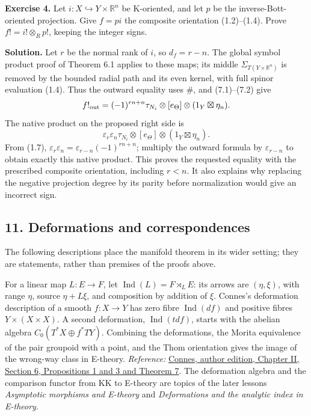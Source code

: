 \documentclass[
  11pt,
]{article}
\begin{document}
\textbf{Exercise 4.} Let \(i:X\hookrightarrow Y\times\mathbb R^n\) be
K-oriented, and let \(p\) be the inverse-Bott-oriented projection. Give
\(f=p i\) the composite orientation (1.2)--(1.4). Prove
\(f!=i!\otimes_Rp!\), keeping the integer signs.

\textbf{Solution.} Let \(r\) be the normal rank of \(i\), so
\(d_f=r-n\). The global symbol product proof of Theorem 6.1 applies to
these maps; its middle \(\Sigma_{T(Y\times\mathbb R^n)}\) is removed by
the bounded radial path and its even kernel, with full spinor evaluation
(1.4). Thus the outward equality uses \(\#\), and (7.1)--(7.2) give \[
 f!_{\rm out}=(-1)^{rn+n}\tau_{N_i}\otimes[e_\Theta]
                         \otimes(1_Y\boxtimes\eta_n).
\] The native product on the proposed right side is \[
 \varepsilon_r\varepsilon_n\tau_{N_i}\otimes[e_\Theta]
                         \otimes(1_Y\boxtimes\eta_n).
\] From (1.7),
\(\varepsilon_r\varepsilon_n=\varepsilon_{r-n}(-1)^{rn+n}\); multiply
the outward formula by \(\varepsilon_{r-n}\) to obtain exactly this
native product. This proves the requested equality with the prescribed
composite orientation, including \(r<n\). It also explains why replacing
the negative projection degree by its parity before normalization would
give an incorrect sign.

\subsection{11. Deformations and
correspondences}\label{deformations-and-correspondences}

The following descriptions place the manifold theorem in its wider
setting; they are statements, rather than premises of the proofs above.

For a linear map \(L:E\to F\), let
\(\operatorname{Ind}(L)=F\rtimes_LE\): its arrows are \((\eta,\xi)\),
with range \(\eta\), source \(\eta+L\xi\), and composition by addition
of \(\xi\). Connes's deformation description of a smooth \(f:X\to Y\)
has zero fibre \(\operatorname{Ind}(df)\) and positive fibres
\(Y\times(X\times X)\). A second deformation,
\(\operatorname{Ind}(t df)\), starts with the abelian algebra
\(C_0(T^*X\oplus f^*TY)\). Combining the deformations, the Morita
equivalence of the pair groupoid with a point, and the Thom orientation
gives the image of the wrong-way class in E-theory. \emph{Reference:}
\href{https://alainconnes.org/wp-content/uploads/book94bigpdf.pdf}{Connes,
author edition, Chapter II, Section 6, Propositions 1 and 3 and Theorem
7}. The deformation algebra and the comparison functor from KK to
E-theory are topics of the later lessons \emph{Asymptotic morphisms and
E-theory} and \emph{Deformations and the analytic index in E-theory}.
\end{document}
